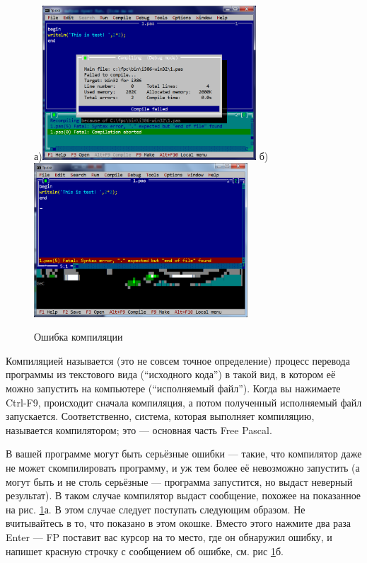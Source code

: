 \begin{figure}
\centerline{
а)\includegraphics[width=8cm]{fp-ce.png}
б)\includegraphics[width=8cm]{fp-ce-expl.png}
}
\caption{Ошибка компиляции}
\label{ce}
\end{figure}

\label{sec:ce}
Компиляцией называется (это не совсем точное определение) процесс перевода программы из текстового вида (``исходного кода'') в такой вид, в котором её можно запустить на компьютере (``исполняемый файл''). Когда вы нажимаете
Ctrl-F9, происходит сначала компиляция, а потом полученный исполняемый файл запускается. Соответственно, система, которая выполняет компиляцию, называется компилятором; это — основная часть Free Pascal.

В вашей программе могут быть серьёзные ошибки — такие, что компилятор даже не может скомпилировать программу, и уж тем более её невозможно запустить (а могут быть и не столь серьёзные — программа запустится, но
выдаст неверный результат). В таком случае компилятор выдаст сообщение, похожее на показанное на рис. \ref{ce}а.
В этом случае следует поступать следующим образом. Не вчитывайтесь в то, что показано в этом окошке. Вместо
этого нажмите два раза Enter — FP поставит вас курсор на то место, где он обнаружил ошибку, и напишет красную
строчку с сообщением об ошибке, см. рис \ref{ce}б.

